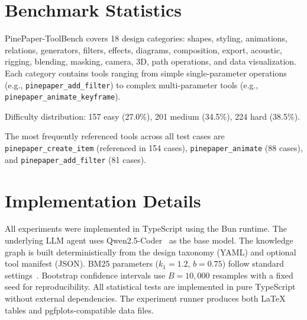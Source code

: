 \documentclass[11pt,a4paper]{article}
\begin{document}



\appendix
\section{Benchmark Statistics}
\label{app:benchmark}

PinePaper-ToolBench covers 18 design categories: shapes, styling, animations, relations, generators, filters, effects, diagrams, composition, export, acoustic, rigging, blending, masking, camera, 3D, path operations, and data visualization. Each category contains tools ranging from simple single-parameter operations (e.g., \texttt{pinepaper\_add\_filter}) to complex multi-parameter tools (e.g., \texttt{pinepaper\_animate\_keyframe}).

Difficulty distribution: 157 easy (27.0\%), 201 medium (34.5\%), 224 hard (38.5\%).

The most frequently referenced tools across all test cases are \texttt{pinepaper\_create\_item} (referenced in 154 cases), \texttt{pinepaper\_animate} (88 cases), and \texttt{pinepaper\_add\_filter} (81 cases).

\section{Implementation Details}
\label{app:implementation}

All experiments were implemented in TypeScript using the Bun runtime. The underlying LLM agent uses Qwen2.5-Coder~\citep{qwen2coder2024} as the base model. The knowledge graph is built deterministically from the design taxonomy (YAML) and optional tool manifest (JSON). BM25 parameters ($k_1=1.2$, $b=0.75$) follow standard settings~\citep{robertson2009bm25}. Bootstrap confidence intervals use $B=10{,}000$ resamples with a fixed seed for reproducibility. All statistical tests are implemented in pure TypeScript without external dependencies. The experiment runner produces both LaTeX tables and pgfplots-compatible data files.
\end{document}
